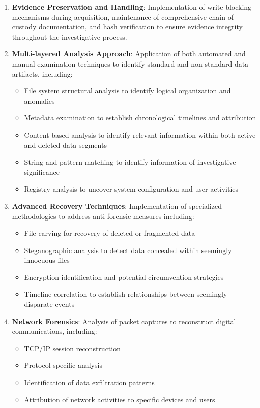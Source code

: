 \begin{enumerate}
    \item \textbf{Evidence Preservation and Handling}: Implementation of write-blocking mechanisms during acquisition, maintenance of comprehensive chain of custody documentation, and hash verification to ensure evidence integrity throughout the investigative process.
    
    \item \textbf{Multi-layered Analysis Approach}: Application of both automated and manual examination techniques to identify standard and non-standard data artifacts, including:
    \begin{itemize}
        \item File system structural analysis to identify logical organization and anomalies
        \item Metadata examination to establish chronological timelines and attribution
        \item Content-based analysis to identify relevant information within both active and deleted data segments
        \item String and pattern matching to identify information of investigative significance
        \item Registry analysis to uncover system configuration and user activities
    \end{itemize}
    
    \item \textbf{Advanced Recovery Techniques}: Implementation of specialized methodologies to address anti-forensic measures including:
    \begin{itemize}
        \item File carving for recovery of deleted or fragmented data
        \item Steganographic analysis to detect data concealed within seemingly innocuous files
        \item Encryption identification and potential circumvention strategies
        \item Timeline correlation to establish relationships between seemingly disparate events
    \end{itemize}
    
    \item \textbf{Network Forensics}: Analysis of packet captures to reconstruct digital communications, including:
    \begin{itemize}
        \item TCP/IP session reconstruction
        \item Protocol-specific analysis
        \item Identification of data exfiltration patterns
        \item Attribution of network activities to specific devices and users
    \end{itemize}
\end{enumerate}

